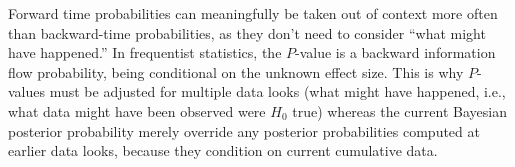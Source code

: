 Forward time probabilities can meaningfully be
taken out of context more often than backward-time probabilities, as
they don't need to consider ``what might have happened.''  In
frequentist statistics, the $P$-value is a backward information flow
probability, being conditional on the unknown effect size.  This is
why $P$-values must be adjusted for multiple data looks (what might
have happened, i.e., what data might have been observed were $H_{0}$
true) whereas the current Bayesian posterior probability 
merely override any posterior probabilities computed at earlier data
looks, because they condition on current cumulative data.
